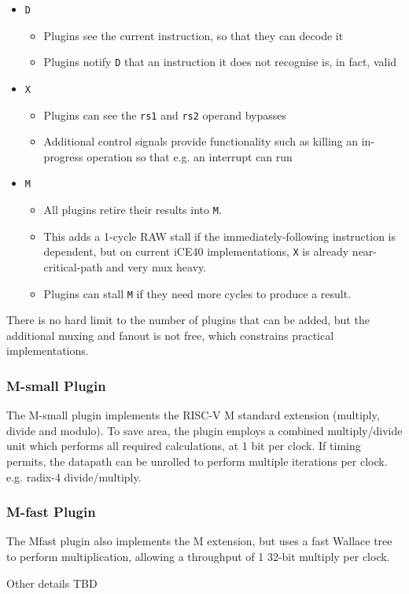 \begin{itemize}
	\item {\tt D}
	\begin{itemize}
		\item Plugins see the current instruction, so that they can decode it
		\item Plugins notify {\tt D} that an instruction it does not recognise is, in fact, valid
	\end{itemize}
	\item {\tt X}
	\begin{itemize}
		\item Plugins can see the {\tt rs1} and {\tt rs2} operand bypasses
		\item Additional control signals provide functionality such as killing an in-progress operation so that e.g. an interrupt can run
	\end{itemize}
	\item {\tt M}
	\begin{itemize}
		\item All plugins retire their results into {\tt M}.
		\item This adds a 1-cycle RAW stall if the immediately-following instruction is dependent, but on current iCE40 implementations, {\tt X} is already near-critical-path and very mux heavy.
		\item Plugins can stall {\tt M} if they need more cycles to produce a result.
	\end{itemize}
\end{itemize}

There is no hard limit to the number of plugins that can be added, but the additional muxing and fanout is not free, which constrains practical implementations.

\subsubsection{M-small Plugin}

The M-small plugin implements the RISC-V M standard extension (multiply, divide and modulo). To save area, the plugin employs a combined multiply/divide unit which performs all required calculations, at 1 bit per clock. If timing permits, the datapath can be unrolled to perform multiple iterations per clock. e.g. radix-4 divide/multiply.

\subsubsection{M-fast Plugin}

The Mfast plugin also implements the M extension, but uses a fast Wallace tree to perform multiplication, allowing a throughput of 1 32-bit multiply per clock.

Other details TBD
